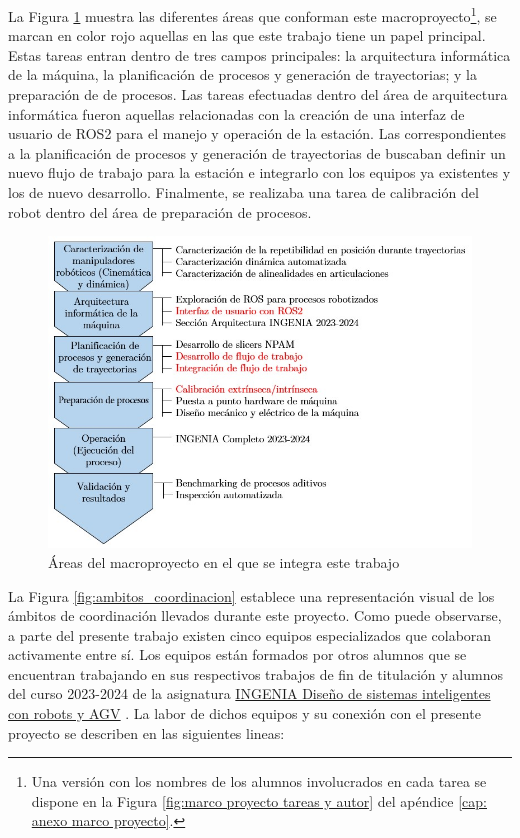 La Figura \ref{fig:areas_macroproyecto} muestra las diferentes áreas que conforman este macroproyecto\footnote{Una versión con los nombres de los alumnos involucrados en cada tarea se dispone en la Figura \ref{fig:marco proyecto tareas y autor} del apéndice \ref{cap: anexo marco proyecto}.}, se marcan en color rojo aquellas en las que este trabajo tiene un papel principal. Estas tareas entran dentro de tres campos principales: la arquitectura informática de la máquina, la planificación de procesos y generación de trayectorias; y la preparación de de procesos. Las tareas efectuadas dentro del área de arquitectura informática fueron aquellas relacionadas con la creación de una interfaz de usuario de ROS2 para el manejo y operación de la estación. Las correspondientes a la planificación de procesos y generación de trayectorias de buscaban definir un nuevo flujo de trabajo para la estación e integrarlo con los equipos ya existentes y los de nuevo desarrollo. Finalmente, se realizaba una tarea de calibración del robot dentro del área de preparación de procesos.

\begin{figure}[h!]
    \centering
    \includegraphics[scale=0.65]{figuras/marco_proyecto_solo_tareas_v2.jpg}
    \caption{Áreas del macroproyecto en el que se integra este trabajo}
    \label{fig:areas_macroproyecto}
\end{figure}

La Figura \ref{fig:ambitos_coordinacion} establece una representación visual de los ámbitos de coordinación llevados durante este proyecto. Como puede observarse, a parte del presente trabajo existen cinco equipos especializados que colaboran activamente entre sí. Los equipos están formados por otros alumnos que se encuentran trabajando en sus respectivos trabajos de fin de titulación y alumnos del curso 2023-2024 de la asignatura \href{http://fabricacion.industriales.upm.es/2022/09/06/asignatura-ingenia-diseno-de-estacion-colaborativa-4-0/}{INGENIA Diseño de sistemas inteligentes con robots y AGV} \cite{web_INGENIA}. La labor de dichos equipos y su conexión con el presente proyecto se describen en las siguientes lineas:


